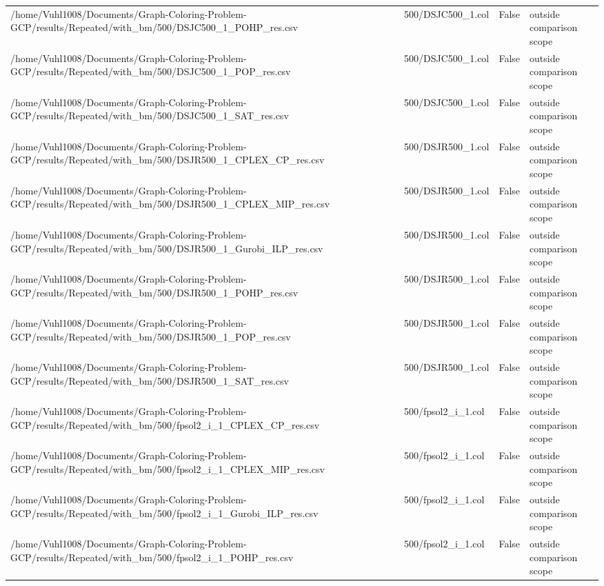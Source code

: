 \begin{table}[htbp]
\begin{tabular}{llll}
/home/Vuhl1008/Documents/Graph-Coloring-Problem-GCP/results/Repeated/with\_bm/500/DSJC500\_1\_POHP\_res.csv & 500/DSJC500\_1.col & False & outside comparison scope \\
/home/Vuhl1008/Documents/Graph-Coloring-Problem-GCP/results/Repeated/with\_bm/500/DSJC500\_1\_POP\_res.csv & 500/DSJC500\_1.col & False & outside comparison scope \\
/home/Vuhl1008/Documents/Graph-Coloring-Problem-GCP/results/Repeated/with\_bm/500/DSJC500\_1\_SAT\_res.csv & 500/DSJC500\_1.col & False & outside comparison scope \\
/home/Vuhl1008/Documents/Graph-Coloring-Problem-GCP/results/Repeated/with\_bm/500/DSJR500\_1\_CPLEX\_CP\_res.csv & 500/DSJR500\_1.col & False & outside comparison scope \\
/home/Vuhl1008/Documents/Graph-Coloring-Problem-GCP/results/Repeated/with\_bm/500/DSJR500\_1\_CPLEX\_MIP\_res.csv & 500/DSJR500\_1.col & False & outside comparison scope \\
/home/Vuhl1008/Documents/Graph-Coloring-Problem-GCP/results/Repeated/with\_bm/500/DSJR500\_1\_Gurobi\_ILP\_res.csv & 500/DSJR500\_1.col & False & outside comparison scope \\
/home/Vuhl1008/Documents/Graph-Coloring-Problem-GCP/results/Repeated/with\_bm/500/DSJR500\_1\_POHP\_res.csv & 500/DSJR500\_1.col & False & outside comparison scope \\
/home/Vuhl1008/Documents/Graph-Coloring-Problem-GCP/results/Repeated/with\_bm/500/DSJR500\_1\_POP\_res.csv & 500/DSJR500\_1.col & False & outside comparison scope \\
/home/Vuhl1008/Documents/Graph-Coloring-Problem-GCP/results/Repeated/with\_bm/500/DSJR500\_1\_SAT\_res.csv & 500/DSJR500\_1.col & False & outside comparison scope \\
/home/Vuhl1008/Documents/Graph-Coloring-Problem-GCP/results/Repeated/with\_bm/500/fpsol2\_i\_1\_CPLEX\_CP\_res.csv & 500/fpsol2\_i\_1.col & False & outside comparison scope \\
/home/Vuhl1008/Documents/Graph-Coloring-Problem-GCP/results/Repeated/with\_bm/500/fpsol2\_i\_1\_CPLEX\_MIP\_res.csv & 500/fpsol2\_i\_1.col & False & outside comparison scope \\
/home/Vuhl1008/Documents/Graph-Coloring-Problem-GCP/results/Repeated/with\_bm/500/fpsol2\_i\_1\_Gurobi\_ILP\_res.csv & 500/fpsol2\_i\_1.col & False & outside comparison scope \\
/home/Vuhl1008/Documents/Graph-Coloring-Problem-GCP/results/Repeated/with\_bm/500/fpsol2\_i\_1\_POHP\_res.csv & 500/fpsol2\_i\_1.col & False & outside comparison scope \\

\end{tabular}
\end{table}
